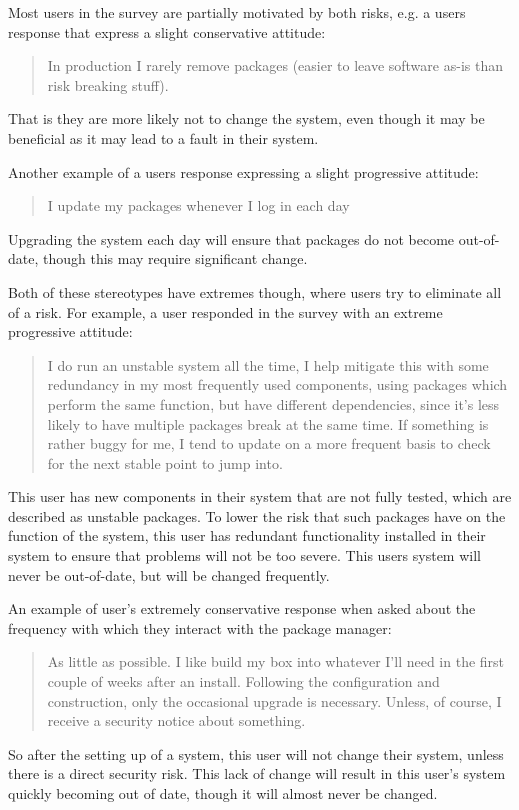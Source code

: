 Most users in the survey are partially motivated by both risks, e.g. a users response that express a slight conservative attitude:
\begin{quotation}
In production I rarely remove packages (easier to leave software as-is than risk breaking stuff).
\end{quotation}
That is they are more likely not to change the system, even though it may be beneficial as it may lead to a fault in their system. 

Another example of a users response expressing a slight progressive attitude:
\begin{quotation}
I update my packages whenever I log in each day
\end{quotation}
Upgrading the system each day will ensure that packages do not become out-of-date, though this may require significant change.

Both of these stereotypes have extremes though, where users try to eliminate all of a risk.
For example, a user responded in the survey with an extreme progressive attitude:
\begin{quotation}
I do run an unstable system all the time, I help mitigate this with some redundancy in my most frequently used components, 
using packages which perform the same function, but have different dependencies, since it's less likely to have multiple packages break at the same time. 
If something is rather buggy for me, I tend to update on a more frequent basis to check for the next stable point to jump into.
\end{quotation}
This user has new components in their system that are not fully tested, which are described as unstable packages.
To lower the risk that such packages have on the function of the system, this user has redundant functionality installed in their system to ensure that problems will not be too severe.
This users system will never be out-of-date, but will be changed frequently.

An example of user's extremely conservative response when asked about the frequency with which they interact with the package manager:
\begin{quotation}
As little as possible. I like build my box into whatever I'll need in the first couple of weeks after an install. 
Following the configuration and construction, only the occasional upgrade is necessary. 
Unless, of course, I receive a security notice about something.
\end{quotation}
So after the setting up of a system, this user will not change their system, unless there is a direct security risk.
This lack of change will result in this user's system quickly becoming out of date, though it will almost never be changed.


